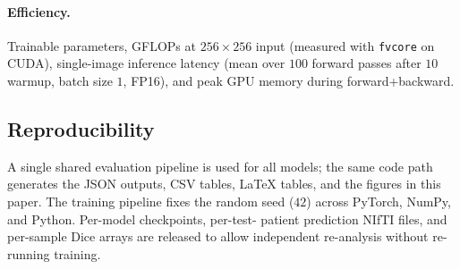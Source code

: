 \paragraph{Efficiency.}
Trainable parameters, GFLOPs at $256\times 256$ input (measured with
\texttt{fvcore} on CUDA), single-image inference latency
(mean over $100$ forward passes after $10$ warmup, batch size $1$, FP16),
and peak GPU memory during forward+backward.

\subsection{Reproducibility}
\label{sec:methods-repro}

A single shared evaluation pipeline is used for all models; the same code
path generates the JSON outputs, CSV tables, LaTeX tables, and the
figures in this paper. The training pipeline fixes the random seed
($42$) across PyTorch, NumPy, and Python. Per-model checkpoints, per-test-
patient prediction NIfTI files, and per-sample Dice arrays are released
to allow independent re-analysis without re-running training.
